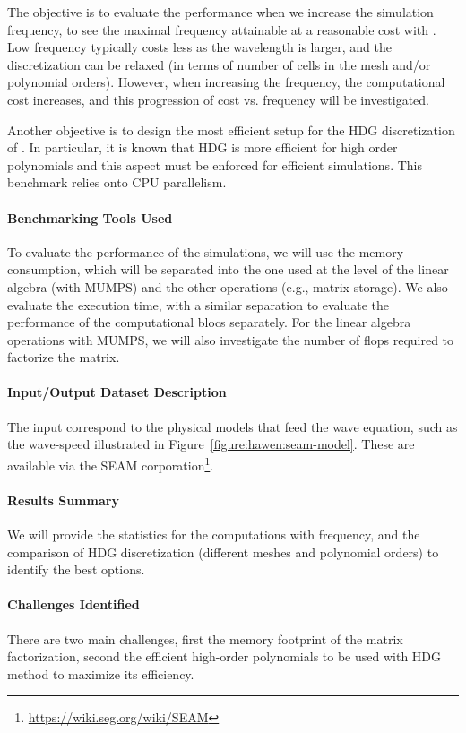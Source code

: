 The objective is to evaluate the performance when we increase the simulation frequency,
to see the maximal frequency attainable at a reasonable cost with \hawen.
Low frequency typically costs less as the wavelength is larger, and the discretization 
can be relaxed (in terms of number of cells in the mesh and/or polynomial orders).
However, when increasing the frequency, the computational cost increases, and this 
progression of cost vs. frequency will be investigated.

Another objective is to design the most efficient setup for the HDG discretization 
of \hawen. In particular, it is known that HDG is more efficient for high order 
polynomials and this aspect must be enforced for efficient simulations. This benchmark
relies onto CPU parallelism.


\paragraph{Benchmarking Tools Used}
To evaluate the performance of the simulations, we will use the memory consumption, 
which will be separated into the one used at the level of the linear algebra (with 
MUMPS) and the other operations (e.g., matrix storage). 
We also evaluate the execution time, with a similar separation to evaluate the 
performance of the computational blocs separately.
For the linear algebra operations with MUMPS, we will also investigate the number
of flops required to factorize the matrix.

\paragraph{Input/Output Dataset Description} The input correspond to the 
physical models that feed the wave equation, such as the wave-speed illustrated
in Figure~\ref{figure:hawen:seam-model}. These are available via the SEAM 
corporation\footnote{\url{https://wiki.seg.org/wiki/SEAM}}.

\paragraph{Results Summary}
We will provide the statistics for the computations with frequency, and 
the comparison of HDG discretization (different meshes and polynomial orders)
to identify the best options.

\paragraph{Challenges Identified} 
There are two main challenges, first the memory footprint of the matrix factorization,
second the efficient high-order polynomials to be used with HDG method to maximize its
efficiency.


